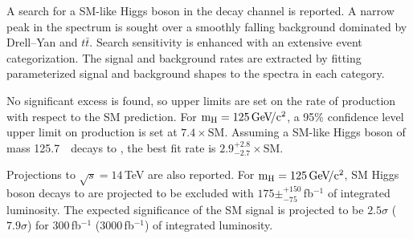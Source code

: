 \documentclass[10pt]{article}
\def\Acknowledgements{\bigskip  \bigskip \begin{center} \begin{large}
             \bf ACKNOWLEDGEMENTS \end{large}\end{center}}
\begin{document}
A search for a SM-like Higgs boson in the \mm{} decay channel is reported.
A narrow \hmm{} peak in the \Mmumu{} spectrum is sought over a smoothly
falling background dominated by Drell--Yan and $t\bar{t}$.  Search
sensitivity is enhanced with an extensive event categorization.  The
signal and background rates are extracted by fitting parameterized
signal and background shapes to the \Mmumu{} spectra in each category.

No significant excess is found, so upper limits are set on the
rate of \hmm{} production with respect to the SM prediction.
For $\mathrm{m_H}{}=125\,\mathrm{Ge\kern -0.1em V\!/c^2}{}$, a 95\% confidence level upper limit
on \hmm{} production is set at $7.4\times\mathrm{SM}$.
Assuming a SM-like Higgs boson of mass 125.7\,\GeVcc{}~\cite{CMS:yva} decays to \mm{},
the best fit rate is $2.9^{+2.8}_{-2.7}\times\mathrm{SM}$.

Projections to $\sqrt{s}=14$\,TeV are also reported.  For $\mathrm{m_H}{}=125\,\mathrm{Ge\kern -0.1em V\!/c^2}{}$,
SM Higgs boson decays to \mm{} are projected to be excluded with
$175\pm^{+150}_{-75}$\,fb$^{-1}$ of integrated luminosity.  The expected significance
of the SM \hmm{} signal is projected to be 
$2.5\sigma$ ($7.9\sigma$) for 300\,fb$^{-1}$ (3000\,fb$^{-1}$) of integrated luminosity.

\end{document}

